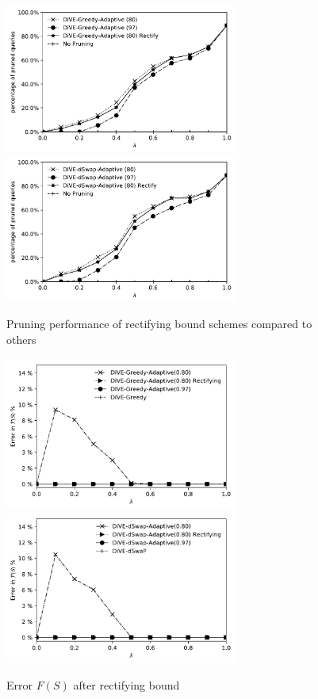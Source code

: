 \documentclass{article}
\begin{document}
\begin{figure}
	\begin{center}
		\vspace{-20pt}
		\includegraphics[width=3.0in]{figures/pruning_performance_greedy_rectifying_step_back}
		\includegraphics[width=3.0in]{figures/pruning_performance_dswap_rectifying_step_back}
		\caption{Pruning performance of rectifying bound schemes compared to others}
		\label{fig:rectifying_bound_greedy_dswap}
	\end{center}
\end{figure}

\begin{figure}
	\begin{center}
		\vspace{-15pt}
		\includegraphics[width=3.0in]{figures/rectifiying_error_f_s_greedy}
		\includegraphics[width=3.0in]{figures/rectifiying_error_f_s_dswap}
		\caption{Error $F(S)$ after rectifying bound}
		\label{fig:error_fs_adaptive}
	\end{center}
\end{figure}
\end{document}
